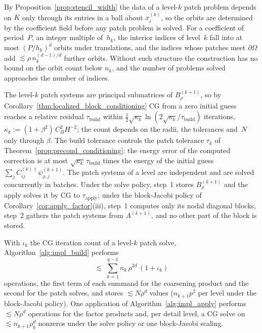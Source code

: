 \documentclass[hidelinks]{siamart}
\theoremstyle{nonumberplain}
\numberwithin{theorem}{section}
\begin{document}
By Proposition~\ref{prop:stencil_width} the data of a level-$k$ patch
problem depends on $K$ only through its entries in a ball about
$x^{(k)}_i$, so the orbits are determined by the coefficient field before any
patch problem is solved.  For a coefficient of period~$P$, an integer
multiple of~$h_k$,
the interior indices of level~$k$ fall into at most $(P/h_k)^d$ orbits
under translations, and the indices whose patches meet $\partial\Omega$
add $\lesssim \rho\, n_k^{(d-1)/d}$ further orbits.  Without such
structure the construction has no bound on the orbit count below $n_k$,
and the number of problems solved approaches the number of indices.

The level-$k$ patch systems are principal submatrices of
$B^{(k+1)}_\rho$, so by Corollary~\ref{thm:localized_block_conditioning}
CG from a zero initial guess reaches a relative residual
$\tau_{\mathrm{build}}$ within
$\tfrac12 \sqrt{\kappa_k} \ln(2\sqrt{\kappa_k}/\tau_{\mathrm{build}})$
iterations, $\kappa_k := (1 + \beta^2)\, C_B^2 H^{-2}$; the count
depends on the radii, the tolerances and~$N$ only through $\beta$.  The
build tolerance controls the patch tolerance $\tau_k$ of
Theorem~\ref{prop:precond_conditioning}: the energy error of the computed
correction is at most $\sqrt{\kappa_k}\, \tau_{\mathrm{build}}$ times the
energy of the initial guess $\sum_j C^{(k)\dagger}_{ij} \psi^{(k+1)}_{\rho,j}$.
The patch systems of a level are independent and are solved concurrently
in batches.  Under the solve policy, step~1 stores $B^{(k+1)}_\rho$ and
the apply solves it by CG to $\tau_{\mathrm{apply}}$; under the
block-Jacobi policy of Corollary~\ref{cor:apply_factor}(iii), step~1
computes only its nodal diagonal blocks, step~2 gathers the patch
systems from $A^{(k+1)}$, and no other part of the block is stored.

\begin{proposition}[Cost]\label{prop:cost}
With $\iota_k$ the CG iteration count of a level-$k$ patch solve,
Algorithm~\ref{alg:impl_build} performs
\begin{equation}\label{eq:build_cost}
  \lesssim\; \sum_{k=1}^{q-1} n_k\, \rho^{2d}\, (1 + \iota_k)
\end{equation}
operations, the first term of each summand for the coarsening product
and the second for the patch solves, and stores $\lesssim N\rho^d$ values
($n_{k+1} p^2$ per level under the block-Jacobi policy).  One application
of Algorithm~\ref{alg:impl_apply} performs $\lesssim N\rho^d$ operations
for the factor products and, per detail level, a CG solve on
$\lesssim n_{k+1} \rho_k^d$ nonzeros under the solve policy or one
block-Jacobi scaling.
\end{proposition}
\end{document}
